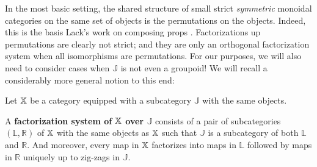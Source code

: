  In the most basic setting, the shared structure of small strict {\em symmetric} monoidal categories on the same set of objects is the permutations on the objects.  Indeed, this is the basis Lack's work on composing props \cite{lack}. Factorizations up permutations are clearly not strict; and they are only an orthogonal factorization system when all isomorphisms are permutations.  For our purposes, we will also need to consider cases when $\mathbb J$ is not even a groupoid!  We will recall a considerably more general notion to this end:
\begingroup
\allowdisplaybreaks
\begin{definition}
\label{def:zigza}
Let $\mathbb{X}$ be a category equipped with a subcategory $\mathbb J$ with the same objects.

A {\bf factorization system of $\mathbb{X}$ over $\mathbb J$} consists of a pair of subcategories $(\mathbb L,\mathbb R)$ of $\mathbb{X}$ with the same objects as $\mathbb{X}$ such that $\mathbb J$ is a subcategory of both $\mathbb L$ and $\mathbb R$.  And moreover, every map in $\mathbb{X}$ factorizes into maps in $\mathbb L$ followed by maps in $\mathbb R$ uniquely up to zig-zags in $\mathbb J$.


\end{definition}

